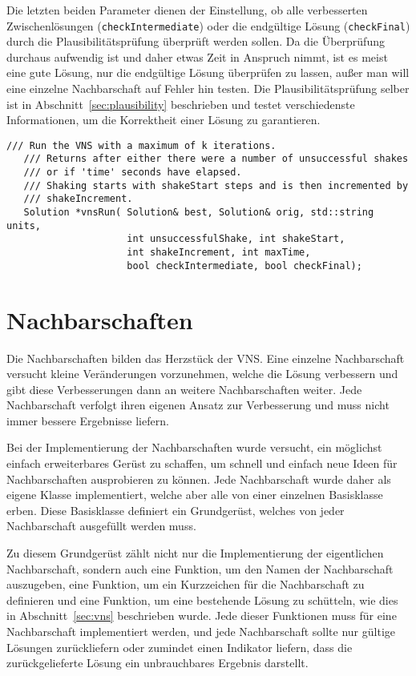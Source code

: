 Die letzten beiden Parameter dienen der Einstellung, ob alle verbesserten Zwischenlösungen (\texttt{checkIntermediate}) oder die endgültige Lösung (\texttt{checkFinal}) durch die Plausibilitätsprüfung überprüft werden sollen.
Da die Überprüfung durchaus aufwendig ist und daher etwas Zeit in Anspruch nimmt, ist es meist eine gute Lösung, nur die endgültige Lösung überprüfen zu lassen, außer man will eine einzelne Nachbarschaft
auf Fehler hin testen. Die Plausibilitätsprüfung selber ist in Abschnitt~\ref{sec:plausibility} beschrieben und testet verschiedenste Informationen, um die Korrektheit einer Lösung zu garantieren.
\singlespacing
\begin{lstlisting}[caption={Signatur der Funktion, welche die Variable Nachbarschaftssuche ausführt und steuert},label={lst:vns}]
   /// Run the VNS with a maximum of k iterations.
   /// Returns after either there were a number of unsuccessful shakes 
   /// or if 'time' seconds have elapsed.
   /// Shaking starts with shakeStart steps and is then incremented by
   /// shakeIncrement.
   Solution *vnsRun( Solution& best, Solution& orig, std::string units, 
                     int unsuccessfulShake, int shakeStart, 
                     int shakeIncrement, int maxTime, 
                     bool checkIntermediate, bool checkFinal);
\end{lstlisting}

\section{Nachbarschaften}
Die Nachbarschaften bilden das Herzstück der VNS. Eine einzelne Nachbarschaft versucht kleine Veränderungen vorzunehmen, welche die Lösung verbessern und gibt diese Verbesserungen dann an weitere Nachbarschaften weiter.
Jede Nachbarschaft verfolgt ihren eigenen Ansatz zur Verbesserung und muss nicht immer bessere Ergebnisse liefern. 

Bei der Implementierung der Nachbarschaften wurde versucht, ein möglichst einfach erweiterbares Gerüst zu schaffen, um schnell und einfach neue Ideen für Nachbarschaften ausprobieren zu können. Jede Nachbarschaft
wurde daher als eigene Klasse implementiert, welche aber alle von einer einzelnen Basisklasse erben. Diese Basisklasse definiert ein Grundgerüst, welches von jeder Nachbarschaft ausgefüllt werden muss. 

Zu diesem Grundgerüst zählt nicht nur die Implementierung der eigentlichen Nachbarschaft, sondern auch eine Funktion, um den Namen der Nachbarschaft auszugeben, eine Funktion, um ein Kurzzeichen für die Nachbarschaft
zu definieren und eine Funktion, um eine bestehende Lösung zu schütteln, wie dies in Abschnitt~\ref{sec:vns} beschrieben wurde. Jede dieser Funktionen muss für eine Nachbarschaft implementiert werden, und jede Nachbarschaft
sollte nur gültige Lösungen zurückliefern oder zumindet einen Indikator liefern, dass die zurückgelieferte Lösung ein unbrauchbares Ergebnis darstellt.

